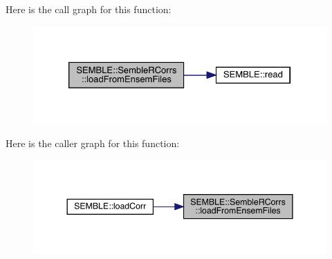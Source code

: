 Here is the call graph for this function\+:
\nopagebreak
\begin{figure}[H]
\begin{center}
\leavevmode
\includegraphics[width=326pt]{d4/d78/classSEMBLE_1_1SembleRCorrs_a0bf9a1942cfecded7e4decd08ee54dcf_cgraph}
\end{center}
\end{figure}
Here is the caller graph for this function\+:
\nopagebreak
\begin{figure}[H]
\begin{center}
\leavevmode
\includegraphics[width=344pt]{d4/d78/classSEMBLE_1_1SembleRCorrs_a0bf9a1942cfecded7e4decd08ee54dcf_icgraph}
\end{center}
\end{figure}
\mbox{\label{classSEMBLE_1_1SembleRCorrs_aae586006dab4a9da40e75f2ac09c30bc}} 
